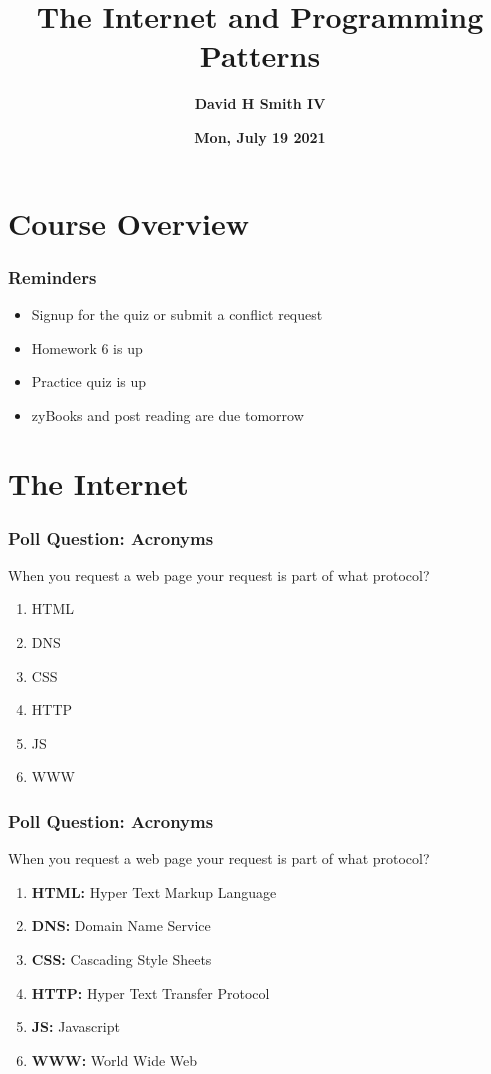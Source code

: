 \documentclass{beamer}
\title{\textbf{The Internet and Programming Patterns}}
\author{\textbf{David H Smith IV}}
\institute[\textbf{UIUC}]{\textbf{University of Illinois Urbana-Champaign}}
\date{\textbf{Mon, July 19 2021}}
\begin{document}
\frame{\titlepage}

\section{Course Overview}

%
%
\begin{frame}
  \frametitle{Reminders}
  \begin{itemize}
    \item Signup for the quiz or submit a conflict request
    \item Homework 6 is up 
    \item Practice quiz is up
    \item zyBooks and post reading are due tomorrow
  \end{itemize}
\end{frame}

\section{The Internet}

%
%
\begin{frame}[fragile]
  \frametitle{Poll Question: Acronyms}
  When you request a web page your request is part of what protocol?
  \vfill
  \begin{enumerate}[A]
    \item HTML
    \item DNS
    \item CSS
    \item HTTP
    \item JS
    \item WWW
  \end{enumerate}
\end{frame}

%
%
\begin{frame}[fragile]
  \frametitle{Poll Question: Acronyms}
  When you request a web page your request is part of what protocol?
  \vfill
  \begin{enumerate}[A]
    \item \textbf{HTML:} Hyper Text Markup Language
    \item \textbf{DNS:} Domain Name Service
    \item \textbf{CSS:} Cascading Style Sheets
    \item \textbf{HTTP:} Hyper Text Transfer Protocol
    \item \textbf{JS:} Javascript
    \item \textbf{WWW:} World Wide Web
  \end{enumerate}
\end{frame}
\end{document}
